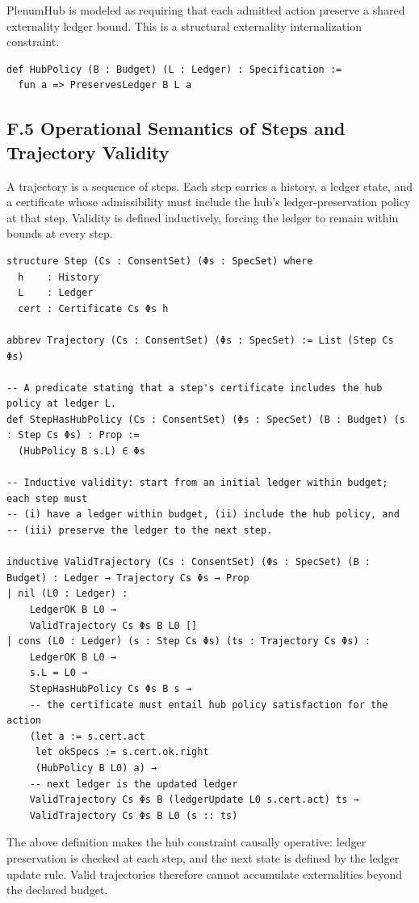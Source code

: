 \documentclass[11pt,oneside]{article}
\begin{document}
PlenumHub is modeled as requiring that each admitted action preserve a shared externality ledger bound. This is a structural externality internalization constraint.

\begin{verbatim}
def HubPolicy (B : Budget) (L : Ledger) : Specification :=
  fun a => PreservesLedger B L a
\end{verbatim}

\subsection{F.5 Operational Semantics of Steps and Trajectory Validity}

A trajectory is a sequence of steps. Each step carries a history, a ledger state, and a certificate whose admissibility must include the hub’s ledger-preservation policy at that step. Validity is defined inductively, forcing the ledger to remain within bounds at every step.

\begin{verbatim}
structure Step (Cs : ConsentSet) (Φs : SpecSet) where
  h    : History
  L    : Ledger
  cert : Certificate Cs Φs h

abbrev Trajectory (Cs : ConsentSet) (Φs : SpecSet) := List (Step Cs Φs)

-- A predicate stating that a step's certificate includes the hub policy at ledger L.
def StepHasHubPolicy (Cs : ConsentSet) (Φs : SpecSet) (B : Budget) (s : Step Cs Φs) : Prop :=
  (HubPolicy B s.L) ∈ Φs

-- Inductive validity: start from an initial ledger within budget; each step must
-- (i) have a ledger within budget, (ii) include the hub policy, and
-- (iii) preserve the ledger to the next step.

inductive ValidTrajectory (Cs : ConsentSet) (Φs : SpecSet) (B : Budget) : Ledger → Trajectory Cs Φs → Prop
| nil (L0 : Ledger) :
    LedgerOK B L0 →
    ValidTrajectory Cs Φs B L0 []
| cons (L0 : Ledger) (s : Step Cs Φs) (ts : Trajectory Cs Φs) :
    LedgerOK B L0 →
    s.L = L0 →
    StepHasHubPolicy Cs Φs B s →
    -- the certificate must entail hub policy satisfaction for the action
    (let a := s.cert.act
     let okSpecs := s.cert.ok.right
     (HubPolicy B L0) a) →
    -- next ledger is the updated ledger
    ValidTrajectory Cs Φs B (ledgerUpdate L0 s.cert.act) ts →
    ValidTrajectory Cs Φs B L0 (s :: ts)
\end{verbatim}

The above definition makes the hub constraint causally operative: ledger preservation is checked at each step, and the next state is defined by the ledger update rule. Valid trajectories therefore cannot accumulate externalities beyond the declared budget.
\end{document}
